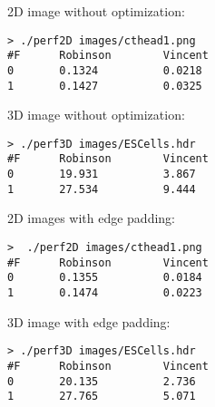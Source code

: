 \documentclass{InsightArticle}
\begin{document}
2D image without optimization:
\begin{verbatim}
> ./perf2D images/cthead1.png
#F      Robinson        Vincent
0       0.1324          0.0218
1       0.1427          0.0325
\end{verbatim}

3D image without optimization:
\begin{verbatim}
> ./perf3D images/ESCells.hdr
#F      Robinson        Vincent
0       19.931          3.867
1       27.534          9.444
\end{verbatim}

2D images with edge padding:
\begin{verbatim}
>  ./perf2D images/cthead1.png
#F      Robinson        Vincent
0       0.1355          0.0184
1       0.1474          0.0223
\end{verbatim}
3D image with edge padding:
\begin{verbatim}
> ./perf3D images/ESCells.hdr
#F      Robinson        Vincent
0       20.135          2.736
1       27.765          5.071
\end{verbatim}
\end{document}
